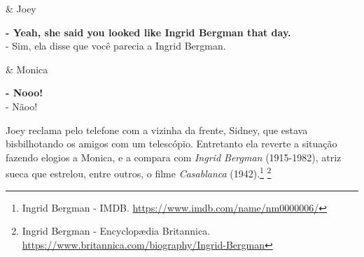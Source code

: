 \begin{tcolorbox}[enhanced,center upper,
    drop fuzzy shadow southeast, boxrule=0.3pt,
    lower separated=false, breakable,
    colframe=black!30!dialogoBorder,colback=white]
\medskip
\begin{minipage}[c]{0.16\linewidth}
   & \centering \scriptsize{Joey}
\end{minipage}
\hfill
\begin{minipage}[c]{0.8\linewidth}
  \textbf{- Yeah, she said you looked like Ingrid Bergman that day.}\\
  - Sim, ela disse que você parecia a Ingrid Bergman.
\end{minipage}

\medskip
\begin{minipage}[c]{0.16\linewidth}
   & \centering \scriptsize{Monica}
\end{minipage}
\hfill
\begin{minipage}[c]{0.8\linewidth}
  \textbf{- Nooo!}\\
  - Nãoo!
\end{minipage}
\end{tcolorbox}

Joey reclama pelo telefone com a vizinha da frente, Sidney, que estava
bisbilhotando os amigos com um telescópio. Entretanto ela reverte a
situação fazendo elogios a Monica, e a compara com \emph{Ingrid Bergman}
(1915-1982), atriz sueca que estrelou, entre outros, o filme
\emph{Casablanca} (1942).\footnote{\sloppy Ingrid Bergman - IMDB. \url{https://www.imdb.com/name/nm0000006/}}
\footnote{\sloppy Ingrid Bergman - Encyclopædia Britannica. \url{https://www.britannica.com/biography/Ingrid-Bergman}}
